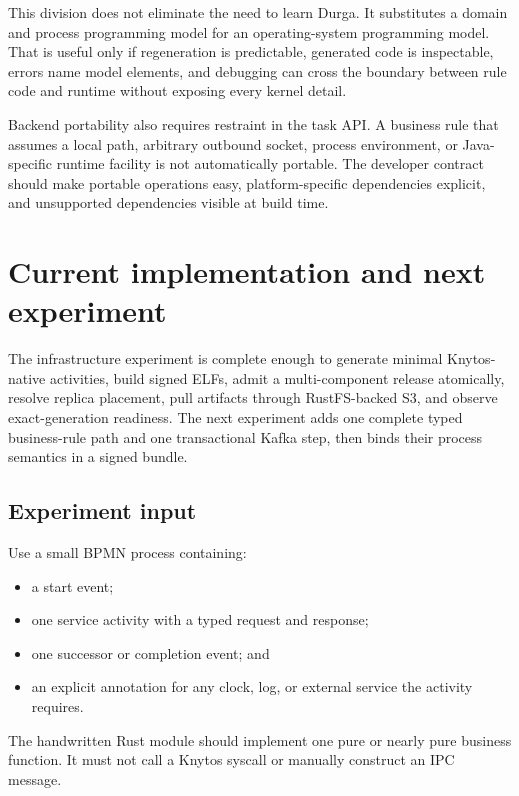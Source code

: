 This division does not eliminate the need to learn Durga. It substitutes a
domain and process programming model for an operating-system programming model.
That is useful only if regeneration is predictable, generated code is
inspectable, errors name model elements, and debugging can
cross the boundary between rule code and runtime without exposing every kernel
detail.

Backend portability also requires restraint in the task API. A business rule
that assumes a local path, arbitrary outbound socket, process environment, or
Java-specific runtime facility is not automatically portable. The developer
contract should make portable operations easy, platform-specific dependencies
explicit, and unsupported dependencies visible at build time.

\section{Current implementation and next experiment}

The infrastructure experiment is complete enough to generate minimal
Knytos-native activities, build signed ELFs, admit a multi-component release
atomically, resolve replica placement, pull artifacts through RustFS-backed S3,
and observe exact-generation readiness. The next experiment adds one complete
typed business-rule path and one transactional Kafka step, then binds their
process semantics in a signed bundle.

\subsection{Experiment input}

Use a small BPMN process containing:

\begin{itemize}
    \item a start event;
    \item one service activity with a typed request and response;
    \item one successor or completion event; and
    \item an explicit annotation for any clock, log, or external service the
        activity requires.
\end{itemize}

The handwritten Rust module should implement one pure or nearly pure business
function. It must not call a Knytos syscall or manually construct an IPC
message.

